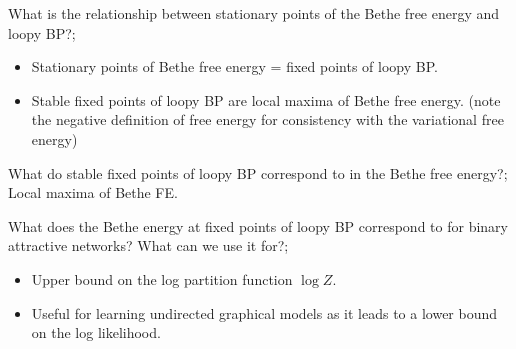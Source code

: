 \documentclass{article}
\begin{document}
What is the relationship between stationary points of the Bethe free energy and loopy BP?; \begin{itemize}
    \item Stationary points of Bethe free energy = fixed points of loopy BP.
    \item Stable fixed points of loopy BP are local maxima of Bethe free energy. (note the negative definition of free energy for consistency with the variational free energy)
\end{itemize}

What do stable fixed points of loopy BP correspond to in the Bethe free energy?; Local maxima of Bethe FE.

What does the Bethe energy at fixed points of loopy BP correspond to for binary attractive networks? What can we use it for?; \begin{itemize}
    \item Upper bound on the log partition function $\log Z$.
    \item Useful for learning undirected graphical models as it leads to a lower bound on the log likelihood.
\end{itemize}

\end{document}
